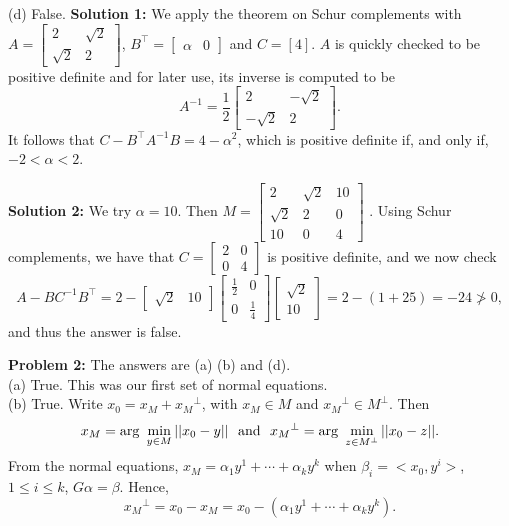 \documentclass[letterpaper]{article}
\begin{document}
(d) False.  \textbf{Solution 1:} We apply the theorem on Schur complements with $A= \left[ \begin{array}{rr}  2&   \sqrt{2}\\  \sqrt{2}& 2\end{array}\right]$, $B^\top= \left[ \begin{array}{rr} \alpha & 0\end{array}\right]$  and $C=[4]$. $A$ is quickly checked to be positive definite and for later use, its inverse is computed to be
$$ A^{-1}= \frac{1}{2}\left[ \begin{array}{rr}  2&   -\sqrt{2}\\  -\sqrt{2}& 2\end{array}\right].$$
It follows that $C-B^\top A^{-1}B = 4 - \alpha^2$, which is positive definite if, and only if, $-2< \alpha < 2$.

\textbf{Solution 2:} We try $\alpha = 10$. Then
$M= \left[ \begin{array}{rrr}  2&   \sqrt{2} & 10\\  \sqrt{2}&   2&   0\\  10&   0&  4\end{array}\right]$ . Using Schur complements, we have that  $C= \left[ \begin{array}{rr}  2&   0\\ 0& 4\end{array}\right]$ is positive definite, and we now check
$$A-BC^{-1}B^\top = 2 -  \left[ \begin{array}{cc}  \sqrt{2} &10\end{array}\right] \left[ \begin{array}{rr} \frac{1}{2}&   0\\ 0& \frac{1}{4}\end{array}\right] \left[ \begin{array}{c}  \sqrt{2}\\10\end{array}\right] = 2 - (1+25) = -24 \not > 0,$$ and thus the answer is false.
\vspace*{1cm}

\noindent \textbf{Problem 2:} The answers are (a) (b) and (d). \\

(a) True. This was our first set of normal equations. \\

(b) True. Write $x_0 = x_M + x_M{^ \perp}$, with $x_M \in M$ and $x_M{^ \perp} \in M^\perp$.  Then
$$x_M= {\rm arg}~\min_{y \in M} ||x_0-y|| ~~\text{and}~~  x_M{^ \perp} ={\rm arg}~\min_{z \in M^\perp} ||x_0-z||.$$
From the normal equations, $x_M = \alpha_1 y^1 + \cdots + \alpha_k y^k$ when $\beta_i=<x_0,y^i>$, $1 \le i \le k$, $G \alpha = \beta$. Hence,
$$x_M{^ \perp}=x_0 -x_M =  x_0-\left(\alpha_1 y^1 + \cdots + \alpha_k y^k\right). $$
\end{document}
